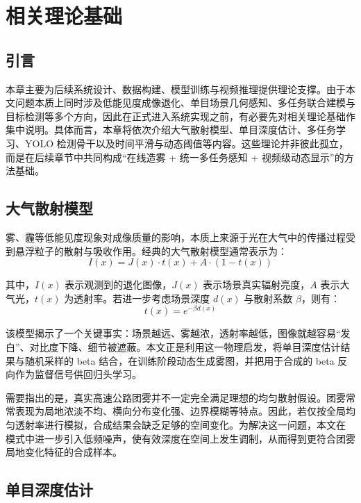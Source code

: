 \chapter{相关理论基础}

\section{引言}

本章主要为后续系统设计、数据构建、模型训练与视频推理提供理论支撑。由于本文问题本质上同时涉及低能见度成像退化、单目场景几何感知、多任务联合建模与目标检测等多个方向，因此在正式进入系统实现之前，有必要先对相关理论基础作集中说明。具体而言，本章将依次介绍大气散射模型、单目深度估计、多任务学习、YOLO 检测骨干以及时间平滑与动态阈值等内容。这些理论并非彼此孤立，而是在后续章节中共同构成“在线造雾 + 统一多任务感知 + 视频级动态显示”的方法基础\cite{koschmieder,midas,caruana1997multitask,ultralyticsDocs}。

\section{大气散射模型}

雾、霾等低能见度现象对成像质量的影响，本质上来源于光在大气中的传播过程受到悬浮粒子的散射与吸收作用。经典的大气散射模型通常表示为\cite{koschmieder}：
\begin{equation}
I(x)=J(x)\cdot t(x)+A\cdot (1-t(x))
\end{equation}

其中，\(I(x)\) 表示观测到的退化图像，\(J(x)\) 表示场景真实辐射亮度，\(A\) 表示大气光，\(t(x)\) 为透射率。若进一步考虑场景深度 \(d(x)\) 与散射系数 \(\beta\)，则有：
\begin{equation}
t(x)=e^{-\beta d(x)}
\end{equation}

该模型揭示了一个关键事实：场景越远、雾越浓，透射率越低，图像就越容易“发白”、对比度下降、细节被遮蔽\cite{koschmieder}。本文正是利用这一物理启发，将单目深度估计结果与随机采样的 beta 结合，在训练阶段动态生成雾图，并把用于合成的 beta 反向作为监督信号供回归头学习。

需要指出的是，真实高速公路团雾并不一定完全满足理想的均匀散射假设。团雾常常表现为局地浓淡不均、横向分布变化强、边界模糊等特点。因此，若仅按全局均匀透射率进行模拟，合成结果会缺乏足够的空间变化。为解决这一问题，本文在  模式中进一步引入低频噪声，使有效深度在空间上发生调制，从而得到更符合团雾局地变化特征的合成样本。

\section{单目深度估计}

